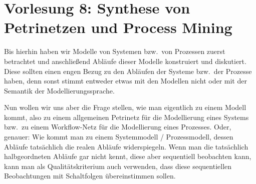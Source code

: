 \section{Vorlesung 8: Synthese von Petrinetzen und Process Mining}

Bis hierhin haben wir Modelle von Systemen bzw.\ von Prozessen zuerst betrachtet und anschließend Abläufe dieser Modelle konstruiert und diskutiert. Diese sollten einen engen Bezug zu den Abläufen der Systeme bzw.\ der Prozesse haben, denn sonst stimmt entweder etwas mit den Modellen nicht oder mit der Semantik der Modellierungssprache.

Nun wollen wir uns aber die Frage stellen, wie man eigentlich zu einem Modell kommt, also zu einem allgemeinen Petrinetz für die Modellierung eines Systems bzw.\ zu einem Workflow-Netz für die Modellierung eines Prozesses. Oder, genauer: Wie kommt man zu einem Systemmodell / Prozessmodell, dessen Abläufe tatsächlich die realen Abläufe widerspiegeln. Wenn man die tatsächlich halbgeordneten Abläufe gar nicht kennt, diese aber sequentiell beobachten kann, kann man als Qualitätskriterium auch verwenden, dass diese sequentiellen Beobachtungen mit Schaltfolgen übereinstimmen sollen.

